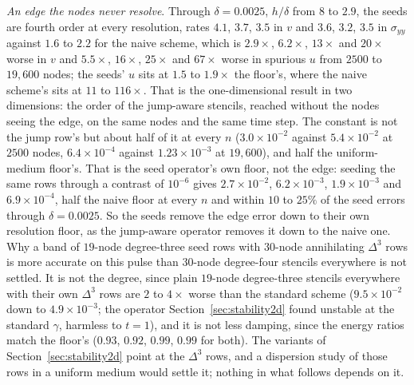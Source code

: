 \documentclass[11pt]{amsart}
\theoremstyle{definition}
\theoremstyle{remark}
\newcommand{\para}[1]{\par\smallskip\noindent\textit{#1}.\enspace}
\begin{document}
\para{An edge the nodes never resolve}
Through $\delta = 0.0025$, $h / \delta$ from $8$ to $2.9$, the seeds are
fourth order at every resolution, rates $4.1$, $3.7$, $3.5$ in $v$ and
$3.6$, $3.2$, $3.5$ in $\sigma_{yy}$ against $1.6$ to $2.2$ for the naive
scheme, which is $2.9\times$, $6.2\times$, $13\times$ and $20\times$
worse in $v$ and $5.5\times$, $16\times$, $25\times$ and $67\times$ worse
in spurious $u$ from $2500$ to $19{,}600$ nodes; the seeds' $u$ sits at
$1.5$ to $1.9\times$ the floor's, where the naive scheme's sits at
$11$ to $116\times$. That is the one-dimensional result in two
dimensions: the order of the jump-aware stencils, reached without the
nodes seeing the edge, on the same nodes and the same time step. The
constant is not the jump row's but about half of it at every $n$
($3.0 \times 10^{-2}$ against $5.4 \times 10^{-2}$ at $2500$ nodes,
$6.4 \times 10^{-4}$ against $1.23 \times 10^{-3}$ at $19{,}600$), and
half the uniform-medium floor's. That is the seed operator's own floor,
not the edge: seeding the same rows through a contrast of $10^{-6}$
gives $2.7 \times 10^{-2}$, $6.2 \times 10^{-3}$, $1.9 \times 10^{-3}$
and $6.9 \times 10^{-4}$, half the naive floor at every $n$ and within
$10$ to $25\%$ of the seed errors through $\delta = 0.0025$. So the seeds
remove the edge error down to their own resolution floor, as the
jump-aware operator removes it down to the naive one. Why a band of
$19$-node degree-three seed rows with $30$-node annihilating $\Delta^3$
rows is more accurate on this pulse than $30$-node degree-four stencils
everywhere is not settled. It is not the degree, since plain $19$-node
degree-three stencils everywhere with their own $\Delta^3$ rows are $2$
to $4\times$ worse than the standard scheme ($9.5 \times 10^{-2}$ down to
$4.9 \times 10^{-3}$; the operator Section~\ref{sec:stability2d} found
unstable at the standard $\gamma$, harmless to $t = 1$), and it is not
less damping, since the energy ratios match the floor's ($0.93$, $0.92$,
$0.99$, $0.99$ for both). The variants of Section~\ref{sec:stability2d}
point at the $\Delta^3$ rows, and a dispersion study of those rows in a
uniform medium would settle it; nothing in what follows depends on it.
\end{document}
